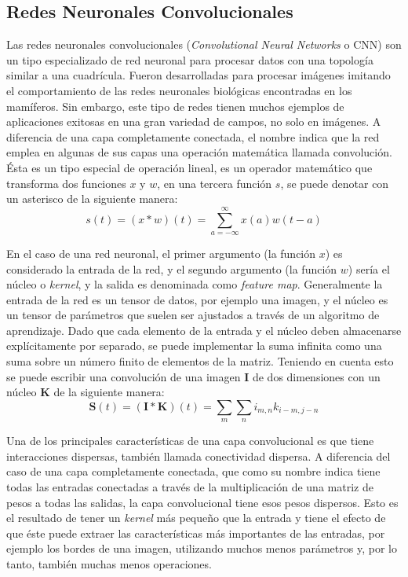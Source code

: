 \documentclass[spanish]{article}
\theoremstyle{definition}
\theoremstyle{remark}
\numberwithin{equation}{section}
\numberwithin{equation}{section} %
\begin{document}
\subsection{Redes Neuronales Convolucionales}
\label{ssecbjetivo:CNN}
Las redes neuronales convolucionales (\textit{Convolutional Neural Networks} o CNN) son un tipo especializado de red neuronal para procesar datos con una topología similar a una cuadrícula. Fueron desarrolladas para procesar imágenes imitando el comportamiento de las redes neuronales biológicas encontradas en los mamíferos. Sin embargo, este tipo de redes tienen muchos ejemplos de aplicaciones exitosas en una gran variedad de campos, no solo en imágenes. A diferencia de una capa completamente conectada, el nombre indica que la red emplea en algunas de sus capas una operación matemática llamada convolución. Ésta es un tipo especial de operación lineal, es un operador matemático que transforma dos funciones $x$ y $w$, en una tercera función $s$, se puede denotar con un asterisco
de la siguiente manera:
\begin{equation}
\label{definicion_convolucion}
s(t)=(x*w)(t)= \sum^{\infty}_{a= -\infty} x(a)w(t-a)
\end{equation} \par
En el caso de una red neuronal, el primer argumento (la función $x$) es considerado la entrada de la red, y el segundo argumento (la función $w$) sería el núcleo o \textit{kernel}, y la salida es denominada como \textit{feature map}. Generalmente la entrada de la red es un tensor de datos, por ejemplo una imagen, y el núcleo es un tensor de parámetros que suelen ser ajustados a través de un algoritmo de aprendizaje. Dado que cada elemento de la entrada y el núcleo deben almacenarse explícitamente por separado, se puede implementar la suma infinita como una suma sobre un número finito de elementos de la matriz. Teniendo en cuenta esto se puede escribir una convolución de una imagen $\boldsymbol{I}$ de dos dimensiones con un núcleo $\boldsymbol{K}$ de la siguiente manera:
\begin{equation}
\label{definicion_convolucion_2d}
\boldsymbol{S}(t)=(\boldsymbol{I}*\boldsymbol{K})(t)= \sum_{m}\sum_{n} i_{m,n} k_{i-m,j-n} 
\end{equation} \par
Una de los principales características de una capa convolucional es que tiene interacciones dispersas, también llamada conectividad dispersa. A diferencia del caso de una capa completamente conectada, que como su nombre indica tiene todas las entradas conectadas a través de la multiplicación de una matriz de pesos a todas las salidas, la capa convolucional tiene esos pesos dispersos. Esto es el resultado de tener un \textit{kernel} más pequeño que la entrada y tiene el efecto de que éste puede extraer las características más importantes de las entradas, por ejemplo los bordes de una imagen, utilizando muchos menos parámetros y, por lo tanto, también muchas menos operaciones. \par
\end{document}
